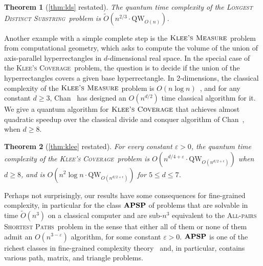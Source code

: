 \documentclass[12pt]{article}
\newcommand{\qw}{\mathrm{QW}}
\newcommand{\APSPf}{\textsc{All-pairs Shortest Paths}}
\newcommand{\APSPc}{\bf{APSP}}
\newcommand{\ldsf}{\textsc{Longest Distinct Substring}}
\newcommand{\KCf}{\textsc{Klee's Coverage}}
\newcommand{\KMf}{\textsc{Klee's Measure}}
\newtheorem*{rtheorem}{Theorem}
\theoremstyle{definition}
\begin{document}
\begin{rtheorem}[\cref{thm:lds} {\normalfont restated}]
The quantum time complexity of the \ldsf\ problem is $\widetilde{O}(n^{2/3}\cdot \qw_{O(n)})$.
\end{rtheorem}

Another example with a simple complete step is the $\KMf$ problem from computational geometry, which asks to compute the volume of the union of 
axis-parallel hyperrectangles in $d$-dimensional real space. In the special case of the \KCf \ problem, the question is to decide if the union of the hyperrectangles covers a given base hyperrectangle.
In 2-dimensions, the classical complexity of the $\KMf$ problem is $O(n \log n)$~\cite{Klee77}, and for any constant $d \geq 3$, Chan~\cite{Chan13} has designed an $O(n^{d/2})$ time classical algorithm for it.
We give a quantum algorithm for $\KCf$ that achieves almost quadratic speedup over the classical divide and conquer algorithm of Chan~\cite{Chan13}, when $d \geq 8$.

\begin{rtheorem}[\cref{thm:klee} {\normalfont restated}]
For every constant $\varepsilon > 0$, the quantum time complexity of the \KCf \ problem is $O(n^{d/4 + \varepsilon} \cdot \qw_{O(n^{d/2+\epsilon})})$ when $d \geq 8$, and is ${O}(n^2 \log n \cdot \qw_{O(n^{d/2+\epsilon})})$ for $5\le d\le 7$.
\end{rtheorem}

Perhaps not surprisingly, our results have some consequences for fine-grained complexity, in particular for the class $\APSPc$ of problems that are solvable in time $\widetilde{O}(n^{3})$ on a classical computer and are sub-$n^3$ equivalent to the \APSPf \ problem in the sense that either all of them or none of them admit an $O(n^{3- \varepsilon})$ algorithm, for some constant $\varepsilon > 0$.
$\APSPc$ is one of the richest classes in fine-grained complexity theory~\cite{VW18, Vas19} and, in particular, contains various path, matrix, and triangle problems. 
\end{document}
